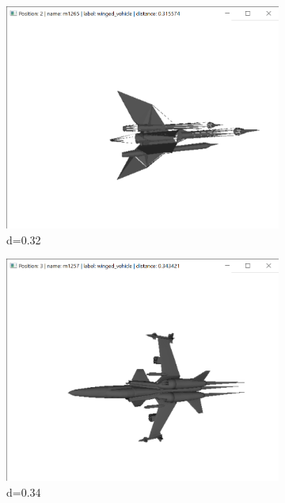 \documentclass{bigdata}
\begin{document}
\begin{figure}[h!]
\begin{subfigure}[b]{0.09\linewidth}
    \includegraphics[width=\linewidth]{Pictures/Evaluation/m42/pos2.png}
    \caption*{d=0.32}
  \end{subfigure}
  \begin{subfigure}[b]{0.09\linewidth}
    \includegraphics[width=\linewidth]{Pictures/Evaluation/m42/pos3.png}
    \caption*{d=0.34}
  \end{subfigure}
  \begin{subfigure}[b]{0.09\linewidth}

\end{subfigure}
\end{figure}
\end{document}
